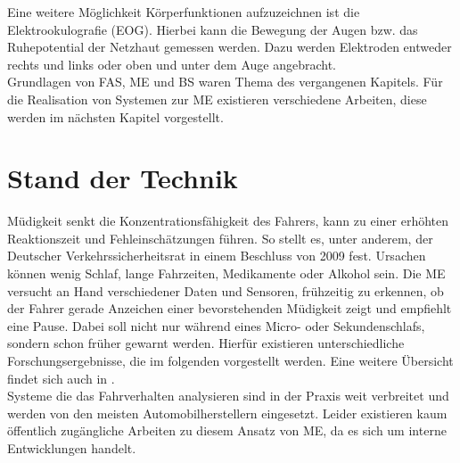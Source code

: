 {Eine weitere Möglichkeit Körperfunktionen aufzuzeichnen ist die Elektrookulografie (EOG). Hierbei kann die Bewegung der Augen bzw. das Ruhepotential der Netzhaut gemessen werden. Dazu werden Elektroden entweder rechts und links oder oben und unter dem Auge angebracht.\\

Grundlagen von \acl{FAS}, \acl{ME} und \acl{BS} waren Thema des vergangenen Kapitels. Für die Realisation von Systemen zur \acl{ME} existieren verschiedene Arbeiten, diese werden im nächsten Kapitel vorgestellt.

\section{Stand der Technik}
\label{chap:me}
Müdigkeit senkt die Konzentrationsfähigkeit des Fahrers, kann zu einer erhöhten Reaktionszeit und Fehleinschätzungen führen. So stellt es, unter anderem, der Deutscher Verkehrssicherheitsrat in einem Beschluss von 2009 \cite{DVR:Online} fest. Ursachen können wenig Schlaf, lange Fahrzeiten, Medikamente oder Alkohol sein.
Die \acl{ME} versucht an Hand verschiedener Daten und Sensoren, frühzeitig zu erkennen, ob der Fahrer gerade Anzeichen einer bevorstehenden Müdigkeit zeigt und empfiehlt eine Pause. Dabei soll nicht nur während eines Micro- oder Sekundenschlafs, sondern schon früher gewarnt werden. Hierfür existieren unterschiedliche Forschungsergebnisse, die im folgenden vorgestellt werden. Eine weitere Übersicht findet sich auch in \cite{Sahayadhas_121216937}.\\

Systeme die das Fahrverhalten analysieren sind in der Praxis weit verbreitet und werden von den meisten Automobilherstellern eingesetzt. Leider existieren kaum öffentlich zugängliche Arbeiten zu diesem Ansatz von  \acl{ME}, da es sich um interne Entwicklungen handelt.

}
